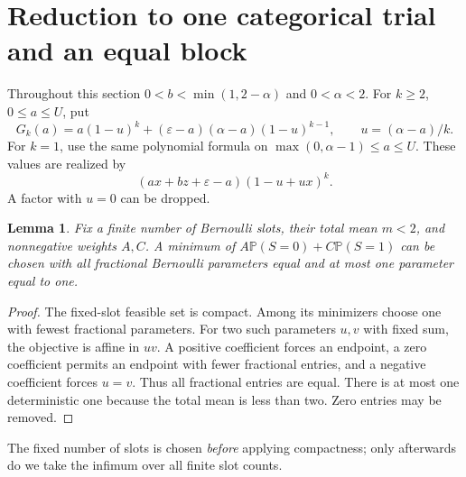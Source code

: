 \documentclass[11pt]{article}
\newtheorem{lemma}[theorem]{Lemma}
\newcommand{\eps}{\varepsilon}
\newcommand{\Prob}{\mathbb P}
\begin{document}
\section{Reduction to one categorical trial and an equal block}
Throughout this section $0<b<\min(1,2-\alpha)$ and $0<\alpha<2$.
For $k\ge2$, $0\le a\le U$, put
\begin{equation}\label{eq:G}
 G_k(a)=a(1-u)^k+(\eps-a)(\alpha-a)(1-u)^{k-1},
 \qquad u=(\alpha-a)/k.
\end{equation}
For $k=1$, use the same polynomial formula on
$\max(0,\alpha-1)\le a\le U$. These values are realized by
\begin{equation}\label{eq:realizer}
 (ax+bz+\eps-a)(1-u+ux)^k.
\end{equation}
A factor with $u=0$ can be dropped.

\begin{lemma}\label{lem:equal}
Fix a finite number of Bernoulli slots, their total mean $m<2$, and
nonnegative weights $A,C$. A minimum of
$A\Prob(S=0)+C\Prob(S=1)$ can be chosen with all fractional Bernoulli
parameters equal and at most one parameter equal to one.
\end{lemma}
\begin{proof}
The fixed-slot feasible set is compact. Among its minimizers choose one
with fewest fractional parameters. For two such parameters $u,v$ with
fixed sum, the objective is affine in $uv$. A positive coefficient
forces an endpoint, a zero coefficient permits an endpoint with fewer
fractional entries, and a negative coefficient forces $u=v$. Thus all
fractional entries are equal. There is at most one deterministic one
because the total mean is less than two. Zero entries may be removed.
\end{proof}
The fixed number of slots is chosen \emph{before} applying compactness;
only afterwards do we take the infimum over all finite slot counts.
\end{document}
